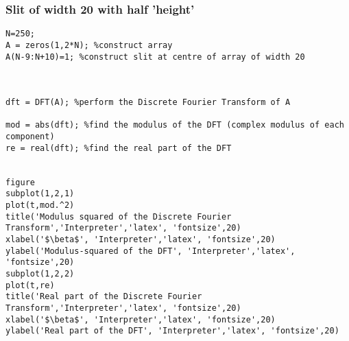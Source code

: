 \documentclass[a4paper,11pt]{article}
\begin{document}
\subsubsection{Slit of width 20 with half 'height'}
\begin{lstlisting}[style=matlab-editor]
N=250;
A = zeros(1,2*N); %construct array
A(N-9:N+10)=1; %construct slit at centre of array of width 20



dft = DFT(A); %perform the Discrete Fourier Transform of A

mod = abs(dft); %find the modulus of the DFT (complex modulus of each component)
re = real(dft); %find the real part of the DFT 


figure
subplot(1,2,1)
plot(t,mod.^2)
title('Modulus squared of the Discrete Fourier Transform','Interpreter','latex', 'fontsize',20)
xlabel('$\beta$', 'Interpreter','latex', 'fontsize',20)
ylabel('Modulus-squared of the DFT', 'Interpreter','latex', 'fontsize',20)
subplot(1,2,2)
plot(t,re)
title('Real part of the Discrete Fourier Transform','Interpreter','latex', 'fontsize',20)
xlabel('$\beta$', 'Interpreter','latex', 'fontsize',20)
ylabel('Real part of the DFT', 'Interpreter','latex', 'fontsize',20)
\end{lstlisting}
\end{document}
